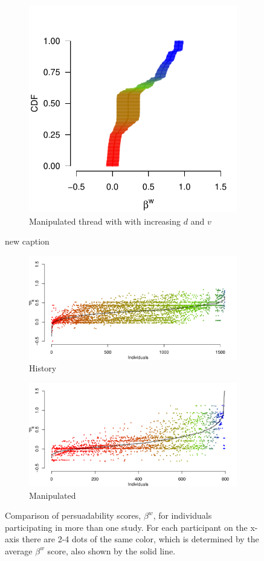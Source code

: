 \documentclass[9pt,twoside,lineno]{pnas-new}
\begin{document}
\begin{figure}
\begin{subfigure}{.44\linewidth}
		\includegraphics[width=.28\linewidth]{beta_max_1097_9.pdf}
		\caption{\footnotesize Manipulated thread with with increasing $d$ and $v$}
		\label{fig:supp max}
	\end{subfigure}
	\caption{new caption}
\label{fig:more}
\end{figure}



\begin{figure}
	\centering
	\begin{subfigure}{1\linewidth}
		\centering
		\includegraphics[width=1\linewidth]{beta_history}
		\caption{\footnotesize History}
		\label{fig: betaw history}
	\end{subfigure}
	\begin{subfigure}{1\linewidth}
		\centering
		\includegraphics[width=1\linewidth]{beta_max}
		\caption{\footnotesize Manipulated}
		\label{fig: betaw manipulated}
	\end{subfigure}
	\caption{Comparison of persuadability scores, $\beta^w$, for individuals participating in more than one study. For each participant on the x-axis there are 2-4 dots of the same color, which is determined by the average $\beta^w$ score, also shown by the solid line.}
	\label{fig: betaw comparisons}
\end{figure}
\end{document}
